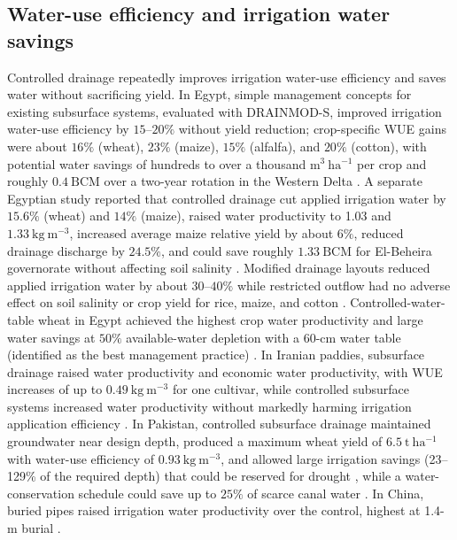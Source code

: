\documentclass[11pt]{article}
\begin{document}
\subsection{Water-use efficiency and irrigation water savings}

Controlled drainage repeatedly improves irrigation water-use efficiency and saves water without sacrificing yield. In Egypt, simple management concepts for existing subsurface systems, evaluated with DRAINMOD-S, improved irrigation water-use efficiency by \(15\textrm{--}20\%\) without yield reduction; crop-specific WUE gains were about \(16\%\) (wheat), \(23\%\) (maize), \(15\%\) (alfalfa), and \(20\%\) (cotton), with potential water savings of hundreds to over a thousand \(\mathrm{m^{3}\ ha^{-1}}\) per crop and roughly \(0.4\ \mathrm{BCM}\) over a two-year rotation in the Western Delta \parencite{Wahba2005}. A separate Egyptian study reported that controlled drainage cut applied irrigation water by \(15.6\%\) (wheat) and \(14\%\) (maize), raised water productivity to 1.03 and \(1.33\ \mathrm{kg\ m^{-3}}\), increased average maize relative yield by about \(6\%\), reduced drainage discharge by \(24.5\%\), and could save roughly \(1.33\ \mathrm{BCM}\) for El-Beheira governorate without affecting soil salinity \parencite{Mahmoud2021}. Modified drainage layouts reduced applied irrigation water by about \(30\textrm{--}40\%\) while restricted outflow had no adverse effect on soil salinity or crop yield for rice, maize, and cotton \parencite{ELATFY1991}. Controlled-water-table wheat in Egypt achieved the highest crop water productivity and large water savings at \(50\%\) available-water depletion with a 60-cm water table (identified as the best management practice) \parencite{ElHassanin2022}. In Iranian paddies, subsurface drainage raised water productivity and economic water productivity, with WUE increases of up to \(0.49\ \mathrm{kg\ m^{-3}}\) for one cultivar, while controlled subsurface systems increased water productivity without markedly harming irrigation application efficiency \parencite{DarziNaftchali2017b,Asgari2021}. In Pakistan, controlled subsurface drainage maintained groundwater near design depth, produced a maximum wheat yield of \(6.5\ \mathrm{t\ ha^{-1}}\) with water-use efficiency of \(0.93\ \mathrm{kg\ m^{-3}}\), and allowed large irrigation savings (23--129\% of the required depth) that could be reserved for drought \parencite{Khan2003}, while a water-conservation schedule could save up to \(25\%\) of scarce canal water \parencite{Sarwar2001}. In China, buried pipes raised irrigation water productivity over the control, highest at 1.4-m burial \parencite{Liu2025}.
\end{document}
